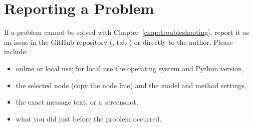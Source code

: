 %
%
%

\section{Reporting a Problem}
\label{sec:helpReport}

If a problem cannot be solved with Chapter~\ref{chap:troubleshooting}, report it as an issue in the GitHub repository (\RepoLink, tab ) or directly to the author. Please include:
\begin{itemize}
  \item online or local use; for local use the operating system and Python version,
  \item the selected node (copy the node line) and the model and method settings,
  \item the exact message text, or a screenshot,
  \item what you did just before the problem occurred.
\end{itemize}

